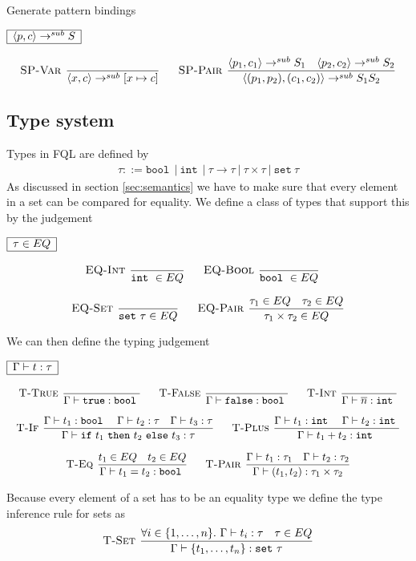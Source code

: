 \documentclass[a4paper]{article}
\newcommand{\pipe}{\ | \ }
\newcommand{\s}[1]{\mathtt{#1}}
\newcommand{\sn}{\overline{n}}
\newcommand{\sLb}{\s{\{}}
\newcommand{\sRb}{\s{\}}}
\newcommand{\sbool}{\s{bool\ }}
\newcommand{\sint}{\s{int\ }}
\newcommand{\sseta}{\s{set\ }}
\newcommand{\sif}{\s{if\ }}
\newcommand{\sthen}{\s{\ then\ }}
\newcommand{\selse}{\s{\ else\ }}
\newcommand{\strue}{\s{true}}
\newcommand{\sfalse}{\s{false}}
\newcommand{\sset}[1]{\sLb #1 \sRb}
\newcommand{\step}{\to}
\newcommand{\stepsub}{\step^{sub}}
\newcommand{\dotset}[2]{\{#1,\ldots,#2\}}
\newcommand{\angled}[1]{\langle #1\rangle}
\renewcommand{\rule}[3][]{\ \mbox{\textsc{#1 }}\dfrac{#2}{#3}\ }
\newcommand{\smbox}[1]{
  $\begin{array}{|c|}
    \hline
    #1 \\
    \hline
  \end{array}$
}
\begin{document}
Generate pattern bindings

\smbox{\angled{p,c} \stepsub S}
\[
\rule[SP-Var]{}{\angled{x,c} \stepsub [x\mapsto c]}\quad
\rule[SP-Pair]{\angled{p_1, c_1} \stepsub S_1 \quad \angled{p_2, c_2} \stepsub S_2}
{\angled{(p_1,p_2), (c_1, c_2)} \stepsub S_1S_2}
\]

\subsection{Type system}
Types in FQL are defined by
\begin{eqnarray*}
\tau ::= \sbool \pipe \sint \pipe \tau \to \tau \pipe \tau \times \tau \pipe \sseta \tau
\end{eqnarray*}
As discussed in section \ref{sec:semantics} we have to make sure
that every element in a set can be compared for equality. We define
a class of types that support this by the judgement 
\smbox{\tau \in EQ}
\[\begin{array}{c}
\rule[EQ-Int]{}{\sint \in EQ}\quad
\rule[EQ-Bool]{}{\sbool \in EQ}\quad\\\\
\rule[EQ-Set]{}{\sseta \tau \in EQ}\quad
\rule[EQ-Pair]{\tau_1 \in EQ \quad \tau_2 \in EQ}{\tau_1 \times \tau_2 \in EQ}
\end{array}\]

We can then define the typing judgement
\smbox{\Gamma \vdash t : \tau}
\[\begin{array}{c}
\rule[T-True]{}{\Gamma \vdash \strue : \sbool}\quad
\rule[T-False]{}{\Gamma \vdash \sfalse : \sbool}\quad
\rule[T-Int]{}{\Gamma \vdash \sn : \sint}
\\\\
\rule[T-If]{\Gamma\vdash t_1 : \sbool \quad \Gamma\vdash t_2 : \tau \quad \Gamma\vdash t_3 : \tau}{\Gamma\vdash \sif t_1 \sthen t_2 \selse t_3 : \tau}\quad
\rule[T-Plus]{\Gamma\vdash t_1 : \sint \quad \Gamma\vdash t_2 : \sint}{\Gamma\vdash t_1 + t_2 : \sint}\\\\
\rule[T-Eq]{t_1 \in EQ \quad t_2 \in EQ}{\Gamma\vdash t_1 = t_2 : \sbool}\quad
\rule[T-Pair]{\Gamma\vdash t_1 : \tau_1 \quad \Gamma \vdash t_2 : \tau_2}{\Gamma \vdash (t_1, t_2) : \tau_1 \times \tau_2}
\end{array}
\]

Because every element of a set has to be an equality type we define the type inference rule for sets as
\[
\rule[T-Set]{\forall i\in \dotset{1}{n}.\ \Gamma\vdash t_i : \tau \quad \tau \in EQ}{\Gamma\vdash\sset{t_1,\ldots,t_n} : \sseta \tau}
\]
\end{document}
